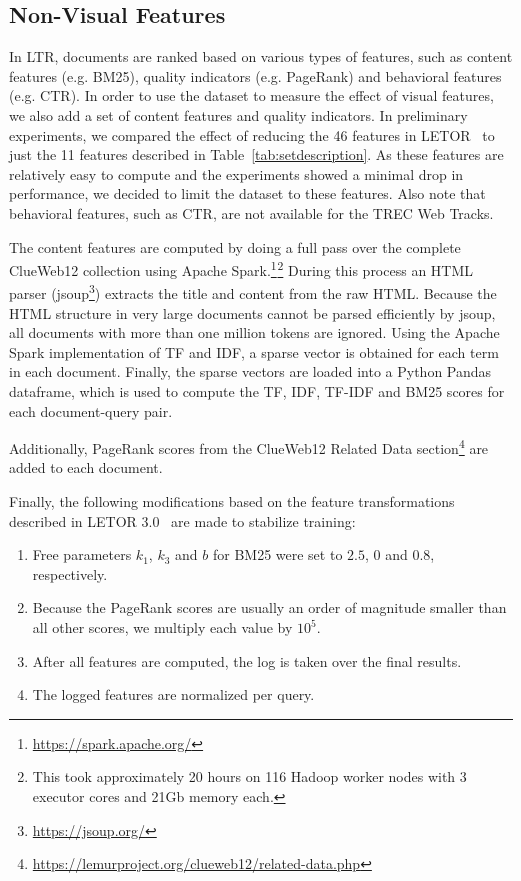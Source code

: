 \subsection{Non-Visual Features} 
\label{sec:contentfeature}
In LTR, documents are ranked based on various types of features, such as content features (e.g. BM25), quality indicators (e.g. PageRank) and behavioral features (e.g. CTR).
In order to use the \datasetname{} dataset to measure the effect of visual features, we also add a set of content features and quality indicators.
In preliminary experiments, we compared the effect of reducing the 46 features in LETOR~\cite{qin2010letor} to just the 11 features described in Table~\ref{tab:setdescription}.
As these features are relatively easy to compute and the experiments showed a minimal drop in performance, we decided to limit the \datasetname{} dataset to these features.
Also note that behavioral features, such as CTR, are not available for the TREC Web Tracks.

The content features are computed by doing a full pass over the complete ClueWeb12 collection using Apache Spark.\footnote{\url{https://spark.apache.org/}}$^{ }$\footnote{This took approximately 20 hours on 116 Hadoop worker nodes with 3 executor cores and 21Gb memory each.}
During this process an HTML parser (jsoup\footnote{\url{https://jsoup.org/}}) extracts the title and content from the raw HTML.
Because the HTML structure in very large documents cannot be parsed efficiently by jsoup, all documents with more than one million tokens are ignored.
Using the Apache Spark implementation of TF and IDF, a sparse vector is obtained for each term in each document. Finally, the sparse vectors are loaded into a Python Pandas dataframe, which is used to compute the TF, IDF, TF-IDF and BM25 scores for each document-query pair.

Additionally, PageRank scores from the ClueWeb12 Related Data section\footnote{\url{https://lemurproject.org/clueweb12/related-data.php}} are added to each document.

Finally, the following modifications based on the feature transformations described in LETOR 3.0~\cite{qin2010letor} are made to stabilize training:
\begin{enumerate}[nosep,leftmargin=14pt]
\item Free parameters $k_1$, $k_3$ and $b$ for BM25 were set to $2.5$, $0$ and $0.8$, respectively. 
\item Because the PageRank scores are usually an order of magnitude smaller than all other scores, we multiply each value by $10^5$.
\item After all features are computed, the log is taken over the final results.
\item The logged features are normalized per query.  
\end{enumerate}

